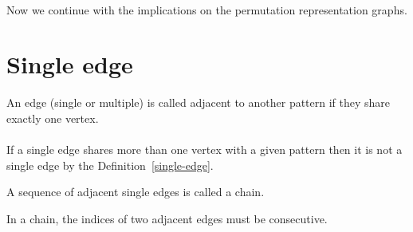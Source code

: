 \paragraph{}
Now we continue with the implications on the permutation representation graphs.

\section{Single edge}

\begin{definition}
  An edge (single or multiple) is called adjacent to another pattern if they share exactly one vertex.
\end{definition}

\paragraph{}
If a single edge shares more than one vertex with a given pattern then it is not a single edge by the Definition~\ref{single-edge}.

\begin{definition}
  A sequence of adjacent single edges is called a chain.
\end{definition}

\begin{proposition}
  \label{chain-consecutive}
  In a chain, the indices of two adjacent edges must be consecutive.
\end{proposition}

